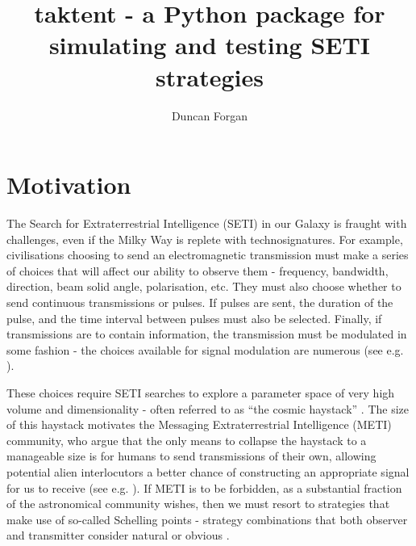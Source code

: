 \documentclass[RNAAS]{aastex62}
\begin{document}
\title{taktent - a Python package for simulating and testing SETI strategies}


\author[0000-0003-1175-4388]{Duncan Forgan}




\section{Motivation}

The Search for Extraterrestrial Intelligence (SETI) in our Galaxy is fraught with challenges, even if the Milky Way is replete with technosignatures.  For example, civilisations choosing to send an electromagnetic transmission must make a series of choices that will affect our ability to observe them - frequency, bandwidth, direction, beam solid angle, polarisation, etc.  They must also choose whether to send continuous transmissions or pulses.  If pulses are sent, the duration of the pulse, and the time interval between pulses must also be selected.  Finally, if transmissions are to contain information, the transmission must be modulated in some fashion - the choices available for signal modulation are numerous (see e.g. \citealt{Messerschmitt2013,Messerschmitt2015}).  

These choices require SETI searches to explore a parameter space of very high volume and dimensionality - often referred to as ``the cosmic haystack'' \citep{TarterPlanetsLife2007,Wright2018a}.  The size of this haystack motivates the Messaging Extraterrestrial Intelligence (METI) community, who argue that the only means to collapse the haystack to a manageable size is for humans to send transmissions of their own, allowing potential alien interlocutors a better chance of constructing an appropriate signal for us to receive (see e.g. \citealt{Lemarchand1994, Vakoch2011, DeMagalhaes2016}).  If METI is to be forbidden, as a substantial fraction of the astronomical community wishes, then we must resort to strategies that make use of so-called Schelling points - strategy combinations that both observer and transmitter consider natural or obvious \citep[see e.g.][]{Wright2017b}.
\end{document}
